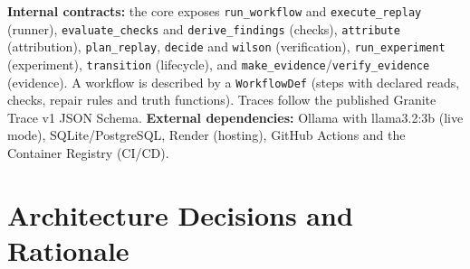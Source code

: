 \documentclass{fast-nuces-bs}
\begin{document}
\textbf{Internal contracts:} the core exposes \texttt{run\_\allowbreak{}workflow} and \texttt{execute\_\allowbreak{}replay} (runner), \texttt{evaluate\_\allowbreak{}checks} and \texttt{derive\_\allowbreak{}findings} (checks), \texttt{attribute} (attribution), \texttt{plan\_\allowbreak{}replay}, \texttt{decide} and \texttt{wilson} (verification), \texttt{run\_\allowbreak{}experiment} (experiment), \texttt{transition} (lifecycle), and \texttt{make\_\allowbreak{}evidence}/\texttt{verify\_\allowbreak{}evidence} (evidence). A workflow is described by a \texttt{WorkflowDef} (steps with declared reads, checks, repair rules and truth functions). Traces follow the published Granite Trace v1 JSON Schema. \textbf{External dependencies:} Ollama with llama3.2:3b (live mode), SQLite/PostgreSQL, Render (hosting), GitHub Actions and the Container Registry (CI/CD).

\section{Architecture Decisions and Rationale}
\end{document}
